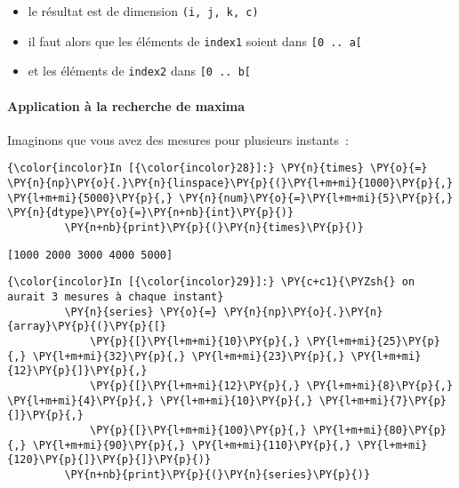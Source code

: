 \begin{itemize}
\tightlist
\item
  le résultat est de dimension \texttt{(i,\ j,\ k,\ c)}
\item
  il faut alors que les éléments de \texttt{index1} soient dans
  \texttt{{[}0\ ..\ a{[}}
\item
  et les éléments de \texttt{index2} dans \texttt{{[}0\ ..\ b{[}}
\end{itemize}

    \hypertarget{application-uxe0-la-recherche-de-maxima}{%
\paragraph{Application à la recherche de
maxima}\label{application-uxe0-la-recherche-de-maxima}}

    Imaginons que vous avez des mesures pour plusieurs instants~:

    \begin{Verbatim}[commandchars=\\\{\}]
{\color{incolor}In [{\color{incolor}28}]:} \PY{n}{times} \PY{o}{=} \PY{n}{np}\PY{o}{.}\PY{n}{linspace}\PY{p}{(}\PY{l+m+mi}{1000}\PY{p}{,} \PY{l+m+mi}{5000}\PY{p}{,} \PY{n}{num}\PY{o}{=}\PY{l+m+mi}{5}\PY{p}{,} \PY{n}{dtype}\PY{o}{=}\PY{n+nb}{int}\PY{p}{)}
         \PY{n+nb}{print}\PY{p}{(}\PY{n}{times}\PY{p}{)}
\end{Verbatim}


    \begin{Verbatim}[commandchars=\\\{\}]
[1000 2000 3000 4000 5000]

    \end{Verbatim}

    \begin{Verbatim}[commandchars=\\\{\}]
{\color{incolor}In [{\color{incolor}29}]:} \PY{c+c1}{\PYZsh{} on aurait 3 mesures à chaque instant}
         \PY{n}{series} \PY{o}{=} \PY{n}{np}\PY{o}{.}\PY{n}{array}\PY{p}{(}\PY{p}{[}
             \PY{p}{[}\PY{l+m+mi}{10}\PY{p}{,} \PY{l+m+mi}{25}\PY{p}{,} \PY{l+m+mi}{32}\PY{p}{,} \PY{l+m+mi}{23}\PY{p}{,} \PY{l+m+mi}{12}\PY{p}{]}\PY{p}{,}
             \PY{p}{[}\PY{l+m+mi}{12}\PY{p}{,} \PY{l+m+mi}{8}\PY{p}{,} \PY{l+m+mi}{4}\PY{p}{,} \PY{l+m+mi}{10}\PY{p}{,} \PY{l+m+mi}{7}\PY{p}{]}\PY{p}{,}
             \PY{p}{[}\PY{l+m+mi}{100}\PY{p}{,} \PY{l+m+mi}{80}\PY{p}{,} \PY{l+m+mi}{90}\PY{p}{,} \PY{l+m+mi}{110}\PY{p}{,} \PY{l+m+mi}{120}\PY{p}{]}\PY{p}{]}\PY{p}{)}
         \PY{n+nb}{print}\PY{p}{(}\PY{n}{series}\PY{p}{)}
\end{Verbatim}


